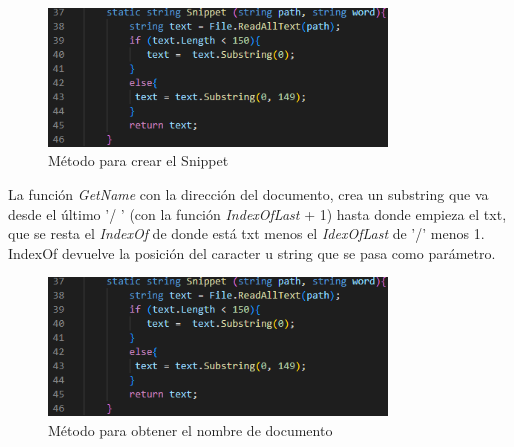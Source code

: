 \documentclass[10pt, letterpaper]{article}
\begin{document}
\begin{figure}[h!]

    \centering
    \label{imag: snippet}
    \includegraphics[width=9cm]{Snippet.png}
    \caption[]{ \footnotesize Método para crear el Snippet}

\end{figure}

 \newpage

La función \textit{GetName} con la dirección del documento, crea un substring que va desde el último '/ '
(con la función \textit{IndexOfLast} + 1) hasta donde empieza el txt, que se resta el \textit{IndexOf} de donde está txt 
menos el \textit{IdexOfLast} de '/' menos 1. IndexOf devuelve la posición del caracter u string que se pasa como 
parámetro. 
\\
\begin{figure}[h!]

    \centering
    \label{imag: docname}
    \includegraphics[width=9cm]{Snippet.png}
    \caption[]{ \footnotesize Método para obtener el nombre de documento}

\end{figure}
\end{document}

